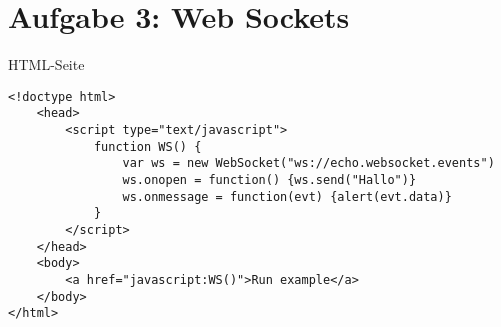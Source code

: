 \documentclass{article}
\begin{document}
	\section*{Aufgabe 3: Web Sockets}
	HTML-Seite
	\begin{lstlisting}[style=html]
<!doctype html>
	<head>
		<script type="text/javascript">
			function WS() {
				var ws = new WebSocket("ws://echo.websocket.events")
				ws.onopen = function() {ws.send("Hallo")}
				ws.onmessage = function(evt) {alert(evt.data)}
			}
		</script>
	</head>
	<body>
		<a href="javascript:WS()">Run example</a>
	</body>
</html>
	\end{lstlisting}
\end{document}
